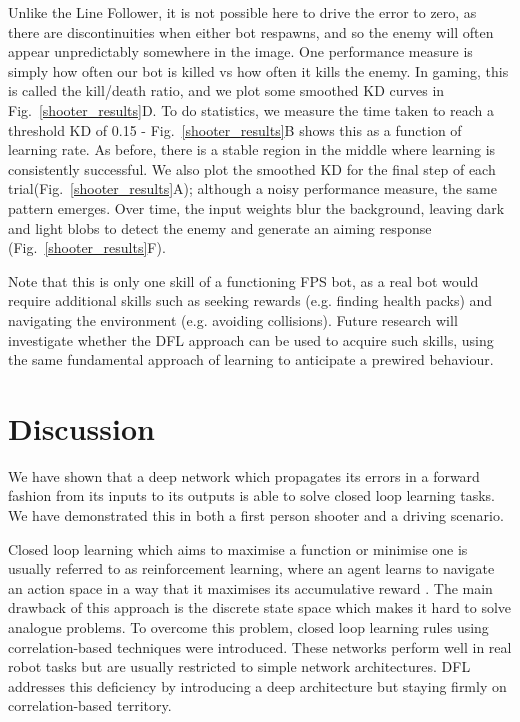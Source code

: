 \documentclass{aamas2018}
\begin{document}
Unlike the Line Follower, it is not possible here to drive the error
to zero, as there are discontinuities when either bot respawns, and so
the enemy will often appear unpredictably somewhere in the image. One
performance measure is simply how often our bot is killed vs how often
it kills the enemy. In gaming, this is called the kill/death ratio,
and we plot some smoothed KD curves in Fig.~\ref{shooter_results}D. To
do statistics, we measure the time taken to reach a threshold KD of 0.15 -
Fig.~\ref{shooter_results}B shows this as a function of learning
rate. As before, there is a stable region in the middle where learning
is consistently successful. We also plot the smoothed KD for the final
step of each trial(Fig.~\ref{shooter_results}A); although a noisy performance
measure, the same pattern emerges. Over time, the input weights blur
the background, leaving dark and light blobs to detect the enemy and
generate an aiming response (Fig.~\ref{shooter_results}F).

Note that this is only one skill of a functioning FPS bot, as a real bot would
require additional skills such as seeking rewards (e.g. finding health packs) and
navigating the environment (e.g. avoiding collisions). Future research
will investigate whether the DFL approach can be used to acquire such
skills, using the same fundamental approach of learning to anticipate
a prewired behaviour.


\section{Discussion}
We have shown that a deep network which propagates its errors in a forward
fashion from its inputs to its outputs is able to solve closed loop
learning tasks. We have demonstrated this in both a first person
shooter and a driving scenario.

Closed loop learning which aims to maximise a function or minimise one
is usually referred to as reinforcement learning, where an agent learns to
navigate an action space in a way that it maximises its accumulative
reward \cite{Dayan1992,Abbott01}. The main drawback of this approach
is the discrete state space which makes it hard to solve analogue
problems. To overcome this problem, closed loop learning rules using
correlation-based techniques \cite{Verschure91} were introduced.
These networks perform well in real robot tasks but are usually restricted to 
simple network architectures. DFL addresses this
deficiency by introducing a deep architecture but staying firmly
on correlation-based territory.
\end{document}
